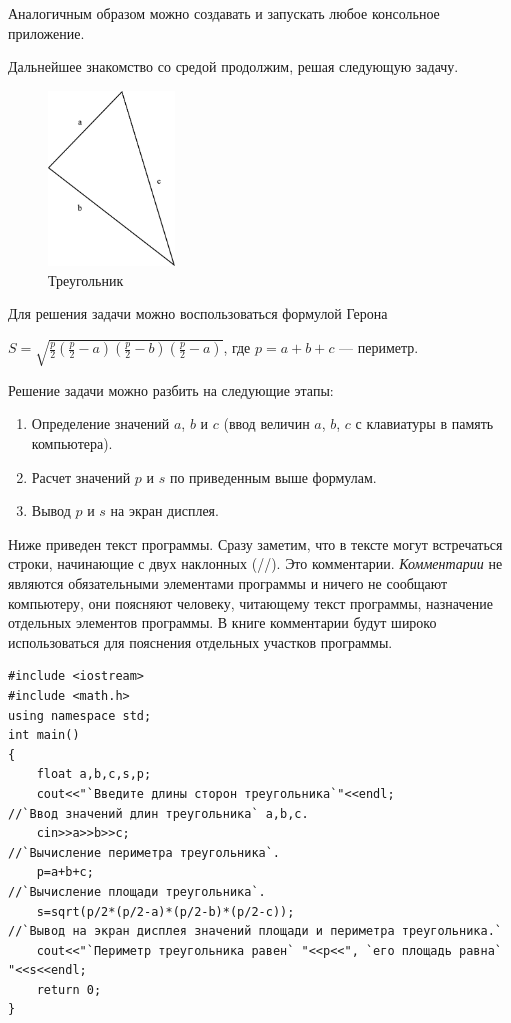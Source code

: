 Аналогичным образом можно создавать и запускать любое консольное приложение.

Дальнейшее знакомство со средой  продолжим, решая следующую задачу.


\begin{figure}[htb]
\begin{center}
\includegraphics[width=0.3\textwidth]{img/ris_1_7}
\caption{Треугольник}
\label{ch01:refDrawing6}
\end{center}
\end{figure}

Для решения задачи можно воспользоваться формулой Герона 

$S=\sqrt{\frac{p}{2}\left(\frac{p}{2}-a\right)\left(\frac{p}{2}-b\right)\left(\frac{p}{2}-a\right)}$, 
где $p=a+b+c$ --- периметр.

Решение задачи можно разбить на следующие этапы:

\begin{enumerate}
\item  Определение значений $a$, $b$ и $c$ (ввод величин $a$, $b$, $c$ с клавиатуры в память компьютера).
\item  Расчет значений $p$ и $s$ по приведенным выше формулам.
\item Вывод $p$ и $s$ на экран дисплея.
\end{enumerate}
Ниже приведен текст программы. Сразу заметим, что в тексте могут встречаться строки, начинающие с двух наклонных (//).
Это комментарии. \emph{Комментарии} не являются обязательными элементами программы и ничего не сообщают компьютеру, 
они поясняют человеку, читающему текст программы, назначение отдельных элементов программы. В книге комментарии 
будут широко использоваться для пояснения
отдельных участков программы.
\begin{lstlisting}
#include <iostream> 
#include <math.h> 
using namespace std; 
int main() 
{ 
    float a,b,c,s,p; 
    cout<<"`Введите длины сторон треугольника`"<<endl; 
//`Ввод значений длин треугольника` a,b,c.
    cin>>a>>b>>c; 
//`Вычисление периметра треугольника`.
    p=a+b+c; 
//`Вычисление площади треугольника`.
    s=sqrt(p/2*(p/2-a)*(p/2-b)*(p/2-c));
//`Вывод на экран дисплея значений площади и периметра треугольника.` 
    cout<<"`Периметр треугольника равен` "<<p<<", `его площадь равна` "<<s<<endl; 
    return 0; 
}
\end{lstlisting}

